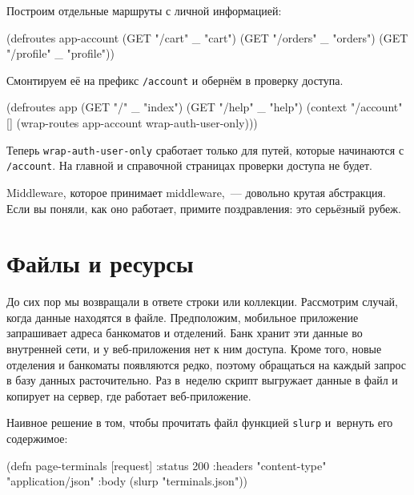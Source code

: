 Построим отдельные маршруты с личной информацией:

\begin{english}
  \begin{clojure}
(defroutes app-account
  (GET "/cart"    _ "cart")
  (GET "/orders"  _ "orders")
  (GET "/profile" _ "profile"))
  \end{clojure}
\end{english}

\noindent
Смонтируем её на префикс \verb|/account| и обернём в проверку доступа.

\begin{english}
  \begin{clojure}
(defroutes app
  (GET "/"     _ "index")
  (GET "/help" _ "help")
  (context "/account" []
    (wrap-routes app-account wrap-auth-user-only)))
  \end{clojure}
\end{english}


Теперь \verb|wrap-auth-user-only| сработает только для путей, которые
начинаются с \verb|/account|. На главной и справочной страницах проверки
доступа не будет.

Middleware, которое принимает middleware,~--- довольно крутая абстракция. Если вы
поняли, как оно работает, примите поздравления: это серьёзный рубеж.

\section{Файлы и ресурсы}

\label{http-files}

До сих пор мы возвращали в ответе строки или коллекции. Рассмотрим случай, когда
данные находятся в файле. Предположим, мобильное приложение запрашивает адреса
банкоматов и отделений. Банк хранит эти данные во внутренней сети, и у
веб-приложения нет к ним доступа. Кроме того, новые отделения и банкоматы
появляются редко, поэтому обращаться на каждый запрос в базу данных
расточительно. Раз в~неделю скрипт выгружает данные в файл и копирует на сервер,
где работает веб-приложение.


Наивное решение в том, чтобы прочитать файл функцией \verb|slurp| и~вернуть
его содержимое:

\begin{english}
  \begin{clojure}
(defn page-terminals [request]
  {:status 200
   :headers {"content-type" "application/json"}
   :body (slurp "terminals.json")})
  \end{clojure}
\end{english}

